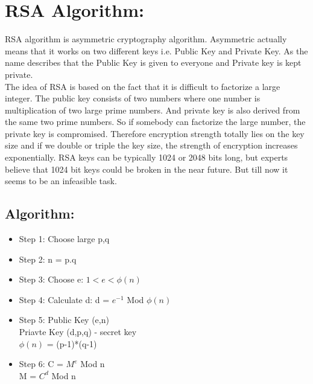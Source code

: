 \documentclass{article}
\begin{document}
\section{RSA Algorithm:}
RSA algorithm is asymmetric cryptography algorithm. Asymmetric actually means that it works on two different keys i.e. Public Key and Private Key. As the name describes that the Public Key is given to everyone and Private key is kept private.\\
The idea of RSA is based on the fact that it is difficult to factorize a large integer. The public key consists of two numbers where one number is multiplication of two large prime numbers. And private key is also derived from the same two prime numbers. So if somebody can factorize the large number, the private key is compromised. Therefore encryption strength totally lies on the key size and if we double or triple the key size, the strength of encryption increases exponentially. RSA keys can be typically 1024 or 2048 bits long, but experts believe that 1024 bit keys could be broken in the near future. But till now it seems to be an infeasible task.
\subsection{Algorithm:}
\begin{itemize}
    \item Step 1: Choose large p,q
    \item Step 2: n = p.q
    \item Step 3: Choose e: $1<e<\phi(n)$
    \item Step 4: Calculate d: d = $e^{-1}$ Mod $\phi(n)$
    \item Step 5: Public Key (e,n)\\
    Priavte Key (d,p,q) - secret key \\
    $\phi(n)$ = (p-1)*(q-1)
    \item Step 6: C = $M^{e}$ Mod n
    \\ M = $C^{d}$ Mod n
\end{itemize}
\end{document}

